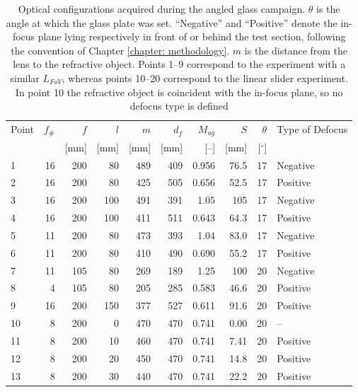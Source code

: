 \begin{table}[h]
    \centering
    \caption[Test matrix of the angled glass campaign]{Optical configurations acquired during the angled glass campaign. $\theta$ is the angle at which the glass plate was set. ``Negative'' and ``Positive'' denote the in-focus plane lying respectively in front of or behind the test section, following the convention of Chapter \ref{chapter: methodology}. $m$ is the distance from the lens to the refractive object. Points 1--9 correspond to the experiment with a similar $L_{FoV}$, whereas points 10--20 correspond to the linear slider experiment. In point 10 the refractive object is coincident with the in-focus plane, so no defocus type is defined}
    \label{tab: angled glass test matrix}
    \begin{tabular}{lrrrrrrrrl}
        \toprule
        Point & $f_\#$ & $f$ & $l$ & $m$ & $d_f$ & $M_{ag}$ & $S$ & $\theta$  & Type of Defocus \\
              &         & [mm] & [mm] & [mm] & [mm] & [--] & [mm] & [$^{\circ}$] & \\
        \midrule
        1    & 16 & 200 &  80 & 489 & 409 & 0.956 &  76.5 & 17 & Negative \\
        2    & 16 & 200 &  80 & 425 & 505 & 0.656 &  52.5 & 17  & Positive \\
        3    & 16 & 200 & 100 & 491 & 391 & 1.05 & 105 & 17  & Negative \\
        4    & 16 & 200 & 100 & 411 & 511 & 0.643 &  64.3 & 17  & Positive \\
        5   & 11 & 200 &  80 & 473 & 393 & 1.04 &  83.0 & 17  & Negative \\
        6   & 11 & 200 &  80 & 410 & 490 & 0.690 &  55.2 & 17  & Positive \\
        7   & 11 & 105 &  80 & 269 & 189 & 1.25 & 100 & 20  & Negative \\
        8   &  4 & 105 &  80 & 205 & 285 & 0.583 &  46.6 & 20  & Positive \\
        9   & 16 & 200 & 150 & 377 & 527 & 0.611 &  91.6 & 20  & Positive \\
        \midrule
        10 & 8 & 200 &  0 & 470 & 470 & 0.741 &  0.00 & 20    & --       \\
        11 & 8 & 200 & 10 & 460 & 470 & 0.741 &  7.41 & 20 & Positive \\
        12 & 8 & 200 & 20 & 450 & 470 & 0.741 & 14.8 & 20  & Positive \\
        13 & 8 & 200 & 30 & 440 & 470 & 0.741 & 22.2 & 20  & Positive \\

\end{tabular}
\end{table}
